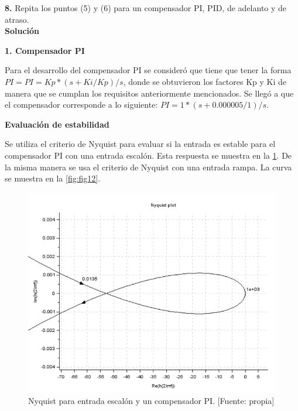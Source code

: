 \documentclass[12pt,letterpaper]{article}
\begin{document}
\bigskip

\bigskip

\textbf{8.} Repita los puntos (5) y (6) para un compensador PI, PID, de adelanto y de atraso.\\

\textbf{Solución}

\bigskip

\textbf{1. Compensador PI}

\bigskip

Para el desarrollo del compensador PI se consideró que tiene que tener la forma $PI= PI = Kp * (s+Ki/Kp)/s$, donde se obtuvieron los factores Kp y Ki de manera que se cumplan los requisitos anteriormente mencionados. Se llegó a que el compensador corresponde a lo siguiente: $PI = 1 * (s+0.000005/1)/s$. 

\bigskip

\textbf{Evaluación de estabilidad}

\bigskip

Se utiliza el criterio de Nyquist para evaluar si la entrada es estable para el compensador PI con una entrada escalón. Esta respuesta se muestra en la \ref{fig:fig11}. De la misma manera se usa el criterio de Nyquist con una entrada rampa. La curva se muestra en la \ref{fig:fig12}.


\bigskip

\begin{figure}[hbtp]
	\centering
	\includegraphics[width = .7 \columnwidth]{8a.png} 
	\caption[Figura7]{Nyquist para entrada escalón y un compensador PI. [Fuente: propia]} 
	\label{fig:fig11} 
\end{figure}
\end{document}
